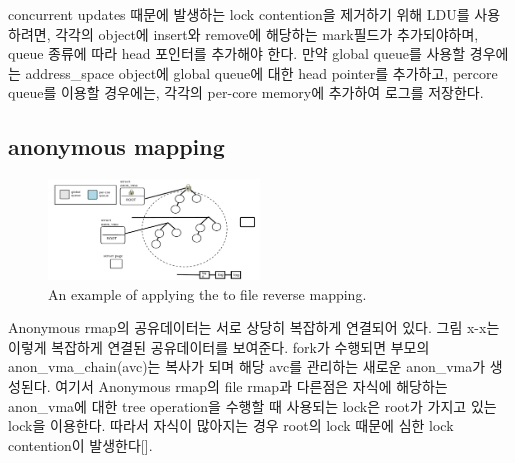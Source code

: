 \fi


\ifkor
concurrent updates 때문에 발생하는 lock contention을 제거하기 위해 LDU를 사용하려면,
각각의 object에 insert와 remove에 해당하는 mark필드가 추가되야하며, queue 종류에 따라 head 포인터를
추가해야 한다. 만약 global queue를 사용할 경우에는 address\_space object에 global queue에 대한
head pointer를 추가하고, percore queue를 이용할 경우에는, 각각의 per-core memory에 추가하여 로그를 
저장한다. 
\else


\fi

\subsection{anonymous mapping}

\begin{figure}[tb]
  \begin{center}
     \includegraphics[width=0.5\textwidth,height=0.5\textheight,keepaspectratio]{fig/anon_vma}
  \end{center}
  \caption{An example of applying the  to file reverse mapping. }
  \label{fig:deferu2}
\end{figure}


\ifkor
Anonymous rmap의 공유데이터는 서로 상당히 복잡하게 연결되어 있다. 
그림 x-x는 이렇게 복잡하게 연결된 공유데이터를 보여준다.
fork가 수행되면 부모의 anon\_vma\_chain(avc)는 복사가 되며 해당 avc를 관리하는 새로운 anon\_vma가 생성된다. 
여기서 Anonymous rmap의 file rmap과 다른점은 자식에 해당하는 anon\_vma에 대한 tree operation을
수행할 때 사용되는 lock은 root가 가지고 있는 lock을 이용한다. 
따라서 자식이 많아지는 경우 root의 lock 때문에 심한 lock contention이 발생한다[].
\else


